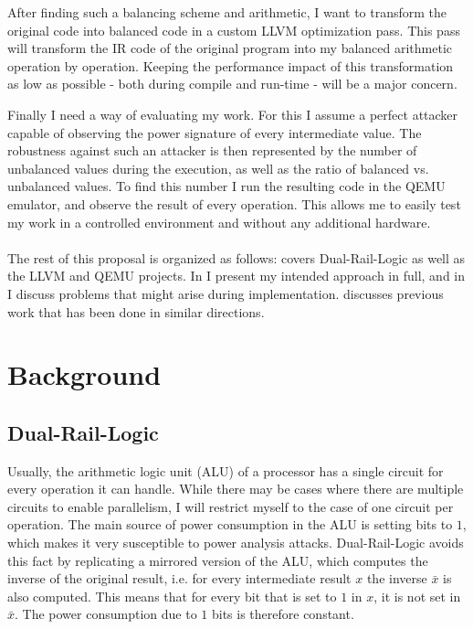 \documentclass{article}
\newcommand{\qemu}{QEMU}
\newcommand{\dual}{Dual-Rail-Logic}
\newcommand{\llvm}{LLVM}
\newcommand{\exposee}{proposal}
\begin{document}
After finding such a balancing scheme and arithmetic, I want to transform the original code into balanced code in a custom \llvm{} optimization pass.
This pass will transform the IR code of the original program into my balanced arithmetic operation by operation.
Keeping the performance impact of this transformation as low as possible - both during compile and run-time - will be a major concern.

Finally I need a way of evaluating my work.
For this I assume a perfect attacker capable of observing the power signature of every intermediate value.
The robustness against such an attacker is then represented by the number of unbalanced values during the execution, as well as the ratio of balanced vs. unbalanced values.
To find this number I run the resulting code in the \qemu{} emulator, and observe the result of every operation.
This allows me to easily test my work in a controlled environment and without any additional hardware.
\\
\\
The rest of this \exposee{} is organized as follows:
 covers \dual{} as well as the \llvm{} and \qemu{} projects.
In  I present my intended approach in full, and in  I discuss problems that might arise during implementation.
 discusses previous work that has been done in similar directions.

\section{Background}
\label{sec:background}
\subsection{\dual{}}
Usually, the arithmetic logic unit (ALU) of a processor has a single circuit for every operation it can handle.
While there may be cases where there are multiple circuits to enable parallelism, I will restrict myself to the case of one circuit per operation.
The main source of power consumption in the ALU is setting bits to $1$, which makes it very susceptible to power analysis attacks.
\dual{} avoids this fact by replicating a mirrored version of the ALU, which computes the inverse of the original result, i.e. for every intermediate result $x$ the inverse $\bar{x}$ is also computed.
This means that for every bit that is set to $1$ in $x$, it is not set in $\bar{x}$.
The power consumption due to $1$ bits is therefore constant.
\end{document}
